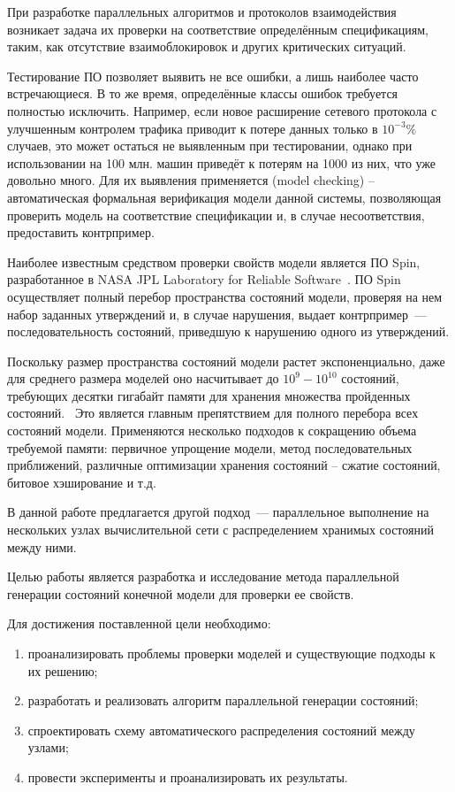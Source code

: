 \Introduction

При разработке параллельных алгоритмов и протоколов взаимодействия возникает задача их
проверки на соответствие определённым спецификациям, таким, как отсутствие
взаимоблокировок и других критических ситуаций.

Тестирование ПО позволяет выявить не все ошибки, а лишь наиболее часто встречающиеся. В то
же время, определённые классы ошибок требуется полностью исключить. Например, если новое
расширение сетевого протокола с улучшенным контролем трафика приводит к потере данных
только в $10^{-3}\%$ случаев, это может остаться не выявленным при тестировании, однако
при использовании на 100 млн. машин приведёт к потерям на 1000 из них, что уже довольно
много. Для их выявления применяется  (model checking) --
автоматическая формальная верификация модели данной системы, позволяющая проверить модель
на соответствие спецификации и, в случае несоответствия, предоставить
контрпример.~\cite{Clarke}

Наиболее известным средством проверки свойств модели является ПО Spin, разработанное в
NASA JPL Laboratory for Reliable Software~\cite{SPIN}. ПО Spin осуществляет полный перебор
пространства состояний модели, проверяя на нем набор заданных утверждений и, в случае
нарушения, выдает контрпример~--- последовательность состояний, приведшую к нарушению
одного из утверждений.

Поскольку размер пространства состояний модели растет экспоненциально, даже для среднего
размера моделей оно насчитывает до $10^9 - 10^{10}$ состояний, требующих десятки гигабайт
памяти для хранения множества пройденных состояний.~\cite{SpinRoot} Это является главным
препятствием для полного перебора всех состояний модели. Применяются несколько подходов к
сокращению объема требуемой памяти: первичное упрощение модели, метод последовательных
приближений, различные оптимизации хранения состояний -- сжатие состояний, битовое
хэширование и т.д.~\cite{Katoen}

В данной работе предлагается другой подход~--- параллельное выполнение на нескольких узлах
вычислительной сети с распределением хранимых состояний между ними.

Целью работы является разработка и исследование метода параллельной генерации состояний
конечной модели для проверки ее свойств.

Для достижения поставленной цели необходимо:
\begin{enumerate}
\item проанализировать проблемы проверки моделей и существующие подходы к их решению;
\item разработать и реализовать алгоритм параллельной генерации состояний;
\item спроектировать схему автоматического распределения состояний между узлами;
\item провести эксперименты и проанализировать их результаты.
\end{enumerate}

